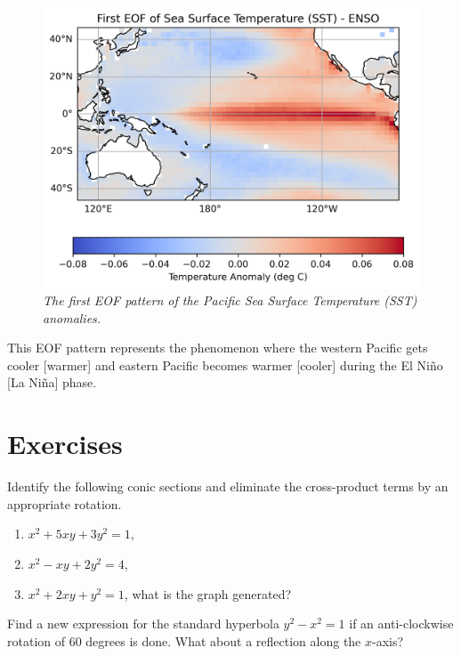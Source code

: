 \begin{figure}[h!]
\centering
\includegraphics[scale=0.75]{graphics/SST_EOF.png}
\caption{\textit{The first EOF pattern of the Pacific Sea Surface Temperature (SST) anomalies.}}
\label{fig:ENSOEOF}
\end{figure}
This EOF pattern represents the  phenomenon where the western Pacific gets cooler [warmer] and eastern Pacific becomes warmer [cooler] during the El Niño [La Niña] phase.

\section{Exercises}

\begin{Exercise}
Identify the following conic sections and eliminate the cross-product terms by an appropriate rotation.
\begin{enumerate}[label=(\alph*)]
\item $x^2 + 5xy + 3y^2 = 1$,
\item $x^2 - xy + 2y^2 = 4$,
\item $x^2 + 2xy + y^2 = 1$, what is the graph generated? 
\end{enumerate}
\end{Exercise}

\begin{Exercise}
Find a new expression for the standard hyperbola $y^2 - x^2 = 1$ if an anti-clockwise rotation of $60$ degrees is done. What about a reflection along the $x$-axis?
\end{Exercise}

